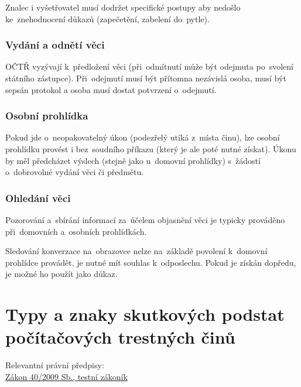 Znalec i vyšetřovatel musí dodržet specifické postupy aby nedošlo ke~znehodnocení důkazů (zapečetění, zabelení do~pytle).

\subsubsection{Vydání a odnětí věci}

OČTŘ vyzývají k~předložení věci (při~odmítnutí může být odejmuta po~svolení státního zástupce).
Při~odejmutí musí být přítomna nezávislá osoba, musí být sepsán protokol a osoba musí dostat potvrzení o~odejmutí.


\subsubsection{Osobní prohlídka}

Pokud jde o~neopakovatelný úkon (podezřelý utíká z~místa činu), lze osobní prohlídku provést i bez~soudního příkazu (který je ale poté nutné získat).
Úkonu by měl předcházet výslech (stejně jako u~domovní prohlídky) s~žádostí o~dobrovolné vydání věci či předmětu.


\subsubsection{Ohledání věci}

Pozorování a~sbírání informací za~účelem objasnění věci je typicky prováděno při~domovních a~osobních prohlídkách.

Sledování konverzace na~obrazovce nelze na~základě povolení k~domovní prohlídce provádět, je nutné mít souhlas k~odposlechu.
Pokud je získán dopředu, je možné ho použít jako důkaz.


\clearpage
\section{Typy a znaky skutkových podstat počítačových trestných činů}


{}Relevantní právní předpisy:
\\\href{https://www.zakonyprolidi.cz/cs/2009-40}{Zákon 40/2009 Sb., testní zákoník}

